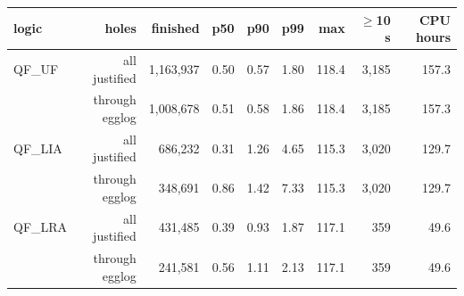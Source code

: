 \begin{tabular}{lrrrrrrrr}
\toprule
logic & holes & finished & p50 & p90 & p99 & max & $\geq$10 s & CPU hours \\
\midrule
QF\_UF & all justified & 1,163,937 & 0.50 & 0.57 & 1.80 & 118.4 & 3,185 & 157.3 \\
 & through egglog & 1,008,678 & 0.51 & 0.58 & 1.86 & 118.4 & 3,185 & 157.3 \\
QF\_LIA & all justified & 686,232 & 0.31 & 1.26 & 4.65 & 115.3 & 3,020 & 129.7 \\
 & through egglog & 348,691 & 0.86 & 1.42 & 7.33 & 115.3 & 3,020 & 129.7 \\
QF\_LRA & all justified & 431,485 & 0.39 & 0.93 & 1.87 & 117.1 & 359 & 49.6 \\
 & through egglog & 241,581 & 0.56 & 1.11 & 2.13 & 117.1 & 359 & 49.6 \\
\bottomrule
\end{tabular}
